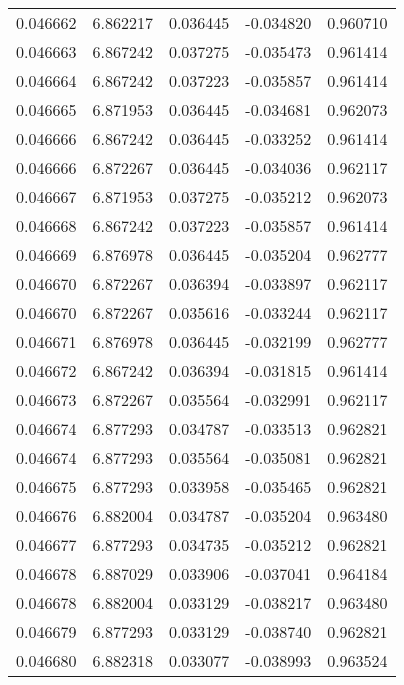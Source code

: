 \begin{tabular}{lrrrr}
0.046662    &  6.862217 &  0.036445 & -0.034820 &             0.960710 \\
0.046663    &  6.867242 &  0.037275 & -0.035473 &             0.961414 \\
0.046664    &  6.867242 &  0.037223 & -0.035857 &             0.961414 \\
0.046665    &  6.871953 &  0.036445 & -0.034681 &             0.962073 \\
0.046666    &  6.867242 &  0.036445 & -0.033252 &             0.961414 \\
0.046666    &  6.872267 &  0.036445 & -0.034036 &             0.962117 \\
0.046667    &  6.871953 &  0.037275 & -0.035212 &             0.962073 \\
0.046668    &  6.867242 &  0.037223 & -0.035857 &             0.961414 \\
0.046669    &  6.876978 &  0.036445 & -0.035204 &             0.962777 \\
0.046670    &  6.872267 &  0.036394 & -0.033897 &             0.962117 \\
0.046670    &  6.872267 &  0.035616 & -0.033244 &             0.962117 \\
0.046671    &  6.876978 &  0.036445 & -0.032199 &             0.962777 \\
0.046672    &  6.867242 &  0.036394 & -0.031815 &             0.961414 \\
0.046673    &  6.872267 &  0.035564 & -0.032991 &             0.962117 \\
0.046674    &  6.877293 &  0.034787 & -0.033513 &             0.962821 \\
0.046674    &  6.877293 &  0.035564 & -0.035081 &             0.962821 \\
0.046675    &  6.877293 &  0.033958 & -0.035465 &             0.962821 \\
0.046676    &  6.882004 &  0.034787 & -0.035204 &             0.963480 \\
0.046677    &  6.877293 &  0.034735 & -0.035212 &             0.962821 \\
0.046678    &  6.887029 &  0.033906 & -0.037041 &             0.964184 \\
0.046678    &  6.882004 &  0.033129 & -0.038217 &             0.963480 \\
0.046679    &  6.877293 &  0.033129 & -0.038740 &             0.962821 \\
0.046680    &  6.882318 &  0.033077 & -0.038993 &             0.963524 \\

\end{tabular}
